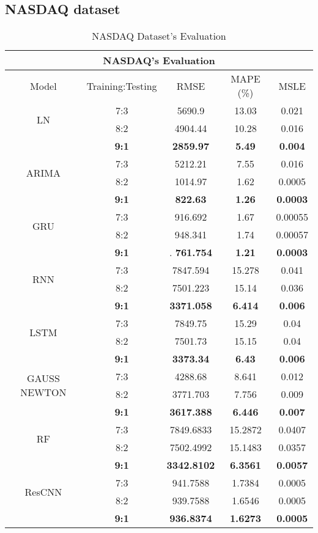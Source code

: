 \documentclass{ieeeojies}
\begin{document}
\subsection{NASDAQ dataset} 
\begin{table}[H]
    \centering
    \begin{tabular}{|c|c|c|c|c|}
         \hline
         \multicolumn{5}{|c|}{\textbf{NASDAQ's Evaluation}}\\
         \hline
         \centering Model & Training:Testing & RMSE & MAPE (\%) & MSLE\\
         \hline
         \multirow{2}{*}{LN} & 7:3 & 5690.9 & 13.03 & 0.021 \\ & 8:2 & 4904.44 & 10.28 & 0.016 \\ & \textbf{9:1} & \textbf{2859.97} & \textbf{5.49} & \textbf{0.004} \\
         \hline
         \multirow{2}{*}{ARIMA} & 7:3 & 5212.21 & 7.55 & 0.016 \\ & 8:2 & 1014.97 & 1.62 & 0.0005 \\ & \textbf{9:1} & \textbf{822.63} & \textbf{1.26} & \textbf{0.0003}\\
         \hline
         \multirow{2}{*}{GRU} & 7:3 & 916.692 & 1.67 & 0.00055 \\ &  8:2 & 948.341 & 1.74 & 0.00057 \\ & \textbf{9:1} &. \textbf{761.754} & \textbf{1.21} & \textbf{0.0003}\\
         \hline
         \multirow{2}{*}{RNN} & 7:3 & 7847.594 & 15.278 & 0.041 \\ & 8:2 & 7501.223 & 15.14 & 0.036 \\ & \textbf{9:1} & \textbf{3371.058} & \textbf{6.414} & \textbf{0.006}\\
         \hline
         \multirow{2}{*}{LSTM} & 7:3 & 7849.75 & 15.29 & 0.04 \\ &8:2 &7501.73 & 15.15 & 0.04 \\ &  \textbf{9:1} & \textbf{3373.34} & \textbf{6.43} & \textbf{0.006}\\
         \hline
         \multirow{2}{*}{GAUSS NEWTON} & 7:3 & 4288.68 & 8.641 & 0.012\\ & 8:2 & 3771.703	& 7.756 & 0.009\\ & \textbf{9:1} & \textbf{3617.388} & \textbf{6.446} & \textbf{0.007}\\
         \hline
         \multirow{2}{*}{RF} & 7:3 &  7849.6833 & 15.2872 & 0.0407 \\ & 8:2 & 7502.4992 & 15.1483 & 0.0357 \\ & \textbf{9:1} &  \textbf{3342.8102} &	\textbf{6.3561} & 	\textbf{0.0057} \\
         \hline
         \multirow{2}{*}{ResCNN} & 7:3 & 941.7588 &  1.7384 &  0.0005 \\ & 8:2 & 939.7588 &  1.6546 &  0.0005 \\ & \textbf{9:1} & \textbf{936.8374} & \textbf{1.6273} & \textbf{0.0005}\\
         \hline
    \end{tabular}
    \caption{NASDAQ Dataset's Evaluation}
    \label{mbbresult}
\end{table}
\end{document}
